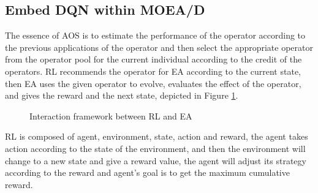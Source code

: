\documentclass[journal]{IEEEtran}
\begin{document}

\subsection{Embed DQN within MOEA/D}
The essence of AOS is to estimate the performance of the operator according to the previous applications of the operator and then select the appropriate operator from the operator pool for the current individual according to the credit of the operators.
RL recommends the operator for EA according to the current state, then EA uses the given operator to evolve, evaluates the effect of the operator, and gives the reward and the next state, depicted in Figure \ref{fig:RLEA}.
\begin{figure}[t]
    \centering
    \caption{Interaction framework between RL and EA}
    \label{fig:RLEA}
\end{figure}
RL is composed of agent, environment, state, action and reward, the agent takes action according to the state of the environment, and then the environment will change to a new state and give a reward value, the agent will adjust its strategy according to the reward and agent's goal is to get the maximum cumulative reward.
\end{document}
